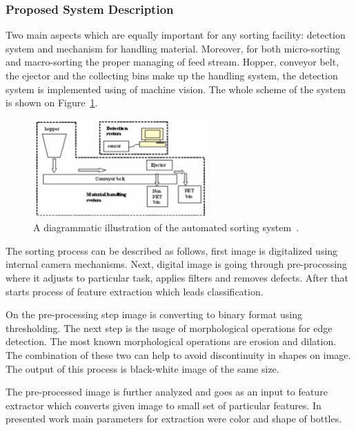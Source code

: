 \documentclass{lutmscthesis}[2010/09/22]
\begin{document}
\subsubsection*{ Proposed System Description }
Two main aspects which are equally important for any sorting
facility: detection system and mechanism for handling material.
Moreover, for both micro-sorting and macro-sorting
the proper managing of feed stream. Hopper, conveyor belt, the ejector
and the collecting bins make up the handling system,
the detection system is implemented using of machine vision.
The whole scheme of the system is shown on
Figure~\ref{afig:scheme_plastic}.

\begin{figure}[htp]
  {\par\centering
  \includegraphics[width=0.60\textwidth]{scheme-plastic}
  \par}
  \caption{A diagrammatic illustration of the automated sorting system~\cite{Wahab:2006}.}
  \label{afig:scheme_plastic}
\end{figure}

The sorting process can be described as follows, first
image is digitalized using internal camera mechanisms.
Next, digital image is going through pre-processing
where it adjusts to particular task, applies filters
and removes defects. After that starts process
of feature extraction which leads classification.

On the pre-processing step image is converting
to binary format using thresholding. The next step is
the usage of morphological operations for
edge detection. The most known morphological operations
are erosion and dilation. The combination of these
two can help to avoid discontinuity in shapes
on image. The output of this process is black-white
image of the same size.

The pre-processed image is further analyzed and
goes as an input to feature extractor which converts
given image to small set of particular features. In presented
work main parameters for extraction were color and
shape of bottles.
\end{document}
